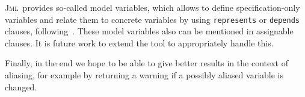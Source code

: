 \documentclass[a4paper]{llncs}
\newcommand{\jml}{\textsc{Jml}}
\begin{document}
\jml\ provides so-called model variables, which allows to define
specification-only variables and relate them to concrete variables by
using \texttt{represents} or \texttt{depends} clauses,
following~\cite{Leino97}. These model variables also can be mentioned
in assignable clauses. It is future work to extend the tool to
appropriately handle this.


Finally, in the end we hope to be able to give better results in the
context of aliasing, for example by returning a warning if a possibly
aliased variable is changed.



\end{document}
